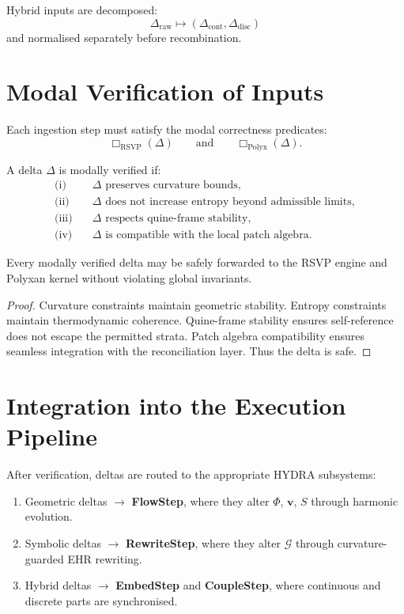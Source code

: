 Hybrid inputs are decomposed:
\[
\Delta_{\mathrm{raw}} 
  \mapsto (\Delta_{\mathrm{cont}}, \Delta_{\mathrm{disc}})
\]
and normalised separately before recombination.

\section{Modal Verification of Inputs}

Each ingestion step must satisfy the modal correctness predicates:
\[
\Box_{\mathrm{RSVP}}(\Delta)
\qquad\text{and}\qquad
\Box_{\mathrm{Polyx}}(\Delta).
\]

\begin{definition}
A delta $\Delta$ is modally verified if:
\[
\begin{aligned}
\text{(i)} &\quad \Delta \text{ preserves curvature bounds},\\
\text{(ii)} &\quad \Delta \text{ does not increase entropy beyond admissible limits},\\
\text{(iii)} &\quad \Delta \text{ respects quine-frame stability},\\
\text{(iv)} &\quad \Delta \text{ is compatible with the local patch algebra}.
\end{aligned}
\]
\end{definition}

\begin{theorem}
Every modally verified delta may be safely forwarded to the RSVP engine 
and Polyxan kernel without violating global invariants.
\end{theorem}

\begin{proof}
Curvature constraints maintain geometric stability.  
Entropy constraints maintain thermodynamic coherence.  
Quine-frame stability ensures self-reference does not escape the permitted 
strata.  
Patch algebra compatibility ensures seamless integration with the reconciliation 
layer.  
Thus the delta is safe.
\end{proof}

\section{Integration into the Execution Pipeline}

After verification, deltas are routed to the appropriate HYDRA subsystems:

\begin{enumerate}
\item Geometric deltas $\to$ \textbf{FlowStep},  
      where they alter $\Phi$, $\mathbf{v}$, $S$ through harmonic evolution.
\item Symbolic deltas $\to$ \textbf{RewriteStep},  
      where they alter $\mathcal{G}$ through curvature-guarded EHR rewriting.
\item Hybrid deltas $\to$ \textbf{EmbedStep} and \textbf{CoupleStep},  
      where continuous and discrete parts are synchronised.
\end{enumerate}

